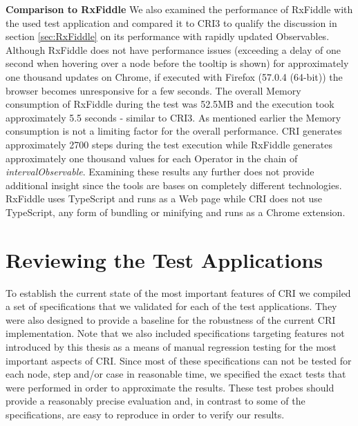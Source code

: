 	\textbf{Comparison to RxFiddle}
	We also examined the performance of RxFiddle with the used test application and compared it to CRI3 to qualify the discussion in section \ref{sec:RxFiddle} on its performance with rapidly updated Observables.
	Although RxFiddle does not have performance issues (exceeding a delay of one second when hovering over a node before the tooltip is shown) for approximately one thousand updates on Chrome, if executed with Firefox (57.0.4 (64-bit)) the browser becomes unresponsive for a few seconds. The overall Memory consumption of RxFiddle during the test was 52.5MB and the execution took approximately 5.5 seconds - similar to CRI3. As mentioned earlier the Memory consumption is not a limiting factor for the overall performance. CRI generates approximately 2700 steps during the test execution while RxFiddle generates approximately one thousand values for each Operator in the chain of \emph{intervalObservable}. Examining these results any further does not provide additional insight since the tools are bases on completely different technologies. RxFiddle uses TypeScript and runs as a Web page while CRI does not use TypeScript, any form of bundling or minifying and runs as a Chrome extension.
	
\section{Reviewing the Test Applications}
\label{sec:EvalTests}
To establish the current state of the most important features of CRI we compiled a set of specifications that we validated for each of the test applications. They were also designed to provide a baseline for the robustness of the current CRI implementation. Note that we also included specifications targeting features not introduced by this thesis as a means of manual regression testing for the most important aspects of CRI. Since most of these specifications can not be tested for each node, step and/or case in reasonable time, we specified the exact tests that were performed in order to approximate the results. These test probes should provide a reasonably precise evaluation and, in contrast to some of the specifications, are easy to reproduce in order to verify our results.

